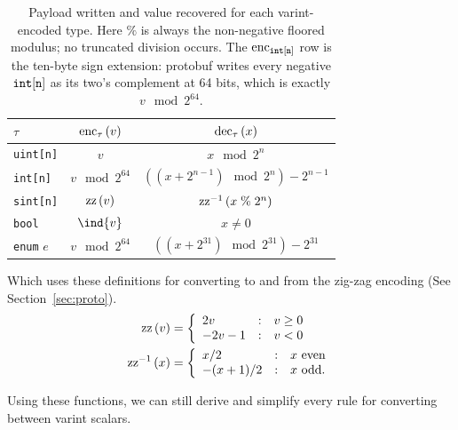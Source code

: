 \begin{table}[H]
  \centering
  \begin{tabular}{l c c}
    \toprule
    $\tau$ & $\mathrm{enc}_{\tau}\left(v\right)$ & $\mathrm{dec}_{\tau}\left(x\right)$ \\
    \midrule
    \texttt{uint[n]} & $v$ & $x \mod 2^n$ \\
    \texttt{int[n]} & $v \mod 2^{64}$ & $((x + 2^{n-1}) \mod 2^n) - 2^{n-1}$ \\
    \texttt{sint[n]} & $\mathrm{zz}\left(v\right)$ & $\mathrm{zz}^{-1}\left(x \;\%\; 2^n\right)$ \\
    \texttt{bool} & $\ind{v}$ & $x \ne 0$ \\
    {\color{red} \texttt{enum} $e$} & $v \mod 2^{64}$ & $((x + 2^{31}) \mod 2^{31}) - 2^{31}$ \\
    \bottomrule
  \end{tabular}
  \caption[Encoding and decoding rules for Varint conversions.]{Payload written
    and value recovered for each varint-encoded type. Here $\%$ is always the
    non-negative floored modulus; no truncated division occurs. The
    $\mathrm{enc}_{\texttt{int}[\texttt{n}]}$ row is the ten-byte sign extension: protobuf writes every
    negative $\texttt{int}[\texttt{n}]$ as its two's complement at 64 bits, which is exactly
    $v \mod 2^{64}$.
  }
  \label{tab:varint-conversion}
\end{table}

Which uses these definitions for converting to and from the zig-zag encoding
(See Section~\ref{sec:proto}).
\begin{align*}
  \zz{v} &= \left\{
    \begin{array}{l@{\quad:\quad}l}
      2v & v \ge 0 \\
      -2v - 1 & v < 0
    \end{array}\right. \\
  \unzz{x} &= \left\{
    \begin{array}{l@{\quad:\quad}l}
      x / 2 & x \text{ even} \\
      -(x + 1) / 2 & x \text{ odd.}
    \end{array}\right.
\end{align*}

Using these functions, we can still derive and simplify every rule for
converting between varint scalars.

